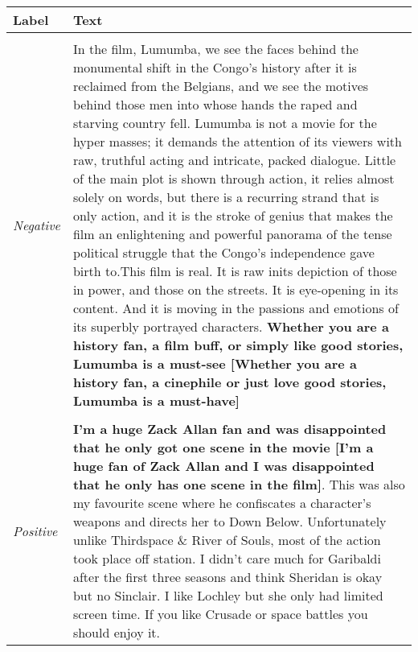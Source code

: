 \documentclass[11pt,a4paper]{article}
\begin{document}
\begin{table*}[!ht]
  \centering
  \small
  \begin{tabular}{p{1.5cm}p{13.5cm}}
  \toprule
  {\bf Label}  & {\bf Text} \\
   \midrule
   \makecell[c]{{\it Positive}\\{{}\it Negative}} & \multicolumn{1}{m{13.5cm}}{In the film, Lumumba, we see the faces behind the monumental shift in the Congo's history after it is  reclaimed from the Belgians, and we see the motives behind those men into whose hands the raped and         starving country fell. Lumumba is not a movie for the hyper masses; it demands the  attention of its viewers with raw, truthful acting and intricate, packed dialogue. Little of the main   plot is shown through action, it relies almost solely on words, but there is a recurring strand that is only action, and it is the stroke of genius that makes the film an enlightening and powerful panorama  of the tense political struggle that the Congo's independence gave birth to.This film is   real. It is raw inits depiction of those in power, and those on the streets. It is eye-opening in its  content. And it is moving in the passions and emotions of its superbly portrayed characters. {\bf Whether you are a history fan, a film buff, or simply like good stories, Lumumba is a must-see {\color{red}[Whether you are a history fan, a cinephile or just love good stories, Lumumba is a must-have]}}}.\\
  \midrule
  \makecell[c]{{\it Negative}\\{{}\it Positive}} & \multicolumn{1}{m{13.5cm}}{{\bf I'm a huge Zack Allan fan and was disappointed that he only got one scene in the movie {\color{red}[I'm a huge fan of Zack Allan and I was disappointed that he only has one scene in the film]}}. This was also my favourite scene where he confiscates a character's weapons and directs her to Down Below. Unfortunately unlike Thirdspace \& River of Souls, most of the action took place off station. I didn't care much for Garibaldi after the first three seasons and think Sheridan is okay but no Sinclair. I like Lochley but she only had limited screen time. If you like Crusade or space battles you should enjoy it.}\\
  \bottomrule
  \end{tabular}
  \caption{Examples of generated adversarial text spans on the SST-5 dataset. The extracted and back-translated text spans are in {\bf bold}. The text in  parentheses {\color{red}[]} is the corresponding paraphrase to flip the prediction.}
  \label{tab:adversarial_example}
\end{table*}
\end{document}
